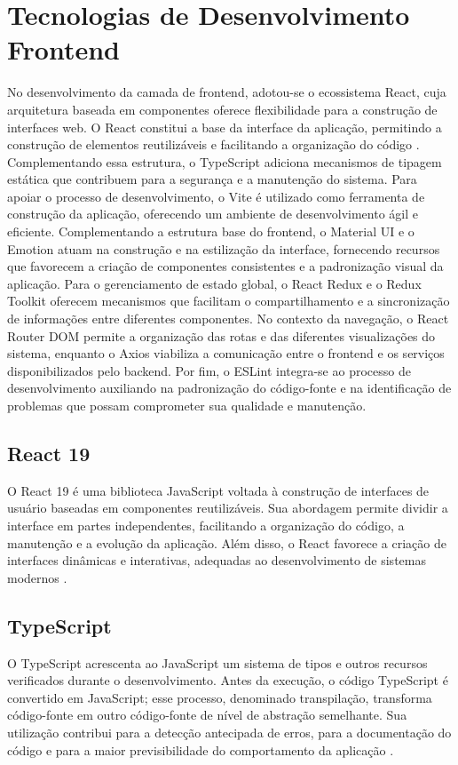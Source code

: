 \section{Tecnologias de Desenvolvimento Frontend}
No desenvolvimento da camada de frontend, adotou-se o ecossistema React, cuja arquitetura baseada em componentes oferece flexibilidade para a construção de interfaces web. O React constitui a base da interface da aplicação, permitindo a construção de elementos reutilizáveis e facilitando a organização do código \cite{react2026}. Complementando essa estrutura, o TypeScript adiciona mecanismos de tipagem estática que contribuem para a segurança e a manutenção do sistema. Para apoiar o processo de desenvolvimento, o Vite é utilizado como ferramenta de construção da aplicação, oferecendo um ambiente de desenvolvimento ágil e eficiente.
Complementando a estrutura base do frontend, o Material UI e o Emotion atuam na construção e na estilização da interface, fornecendo recursos que favorecem a criação de componentes consistentes e a padronização visual da aplicação. Para o gerenciamento de estado global, o React Redux e o Redux Toolkit oferecem mecanismos que facilitam o compartilhamento e a sincronização de informações entre diferentes componentes. No contexto da navegação, o React Router DOM permite a organização das rotas e das diferentes visualizações do sistema, enquanto o Axios viabiliza a comunicação entre o frontend e os serviços disponibilizados pelo backend. Por fim, o ESLint integra-se ao processo de desenvolvimento auxiliando na padronização do código-fonte e na identificação de problemas que possam comprometer sua qualidade e manutenção.

\subsection{React 19}
O React 19 é uma biblioteca JavaScript voltada à construção de interfaces de usuário baseadas em componentes reutilizáveis. Sua abordagem permite dividir a interface em partes independentes, facilitando a organização do código, a manutenção e a evolução da aplicação. Além disso, o React favorece a criação de interfaces dinâmicas e interativas, adequadas ao desenvolvimento de sistemas modernos \cite{react2026}.

\subsection{TypeScript}
O TypeScript acrescenta ao JavaScript um sistema de tipos e outros recursos verificados durante o desenvolvimento. Antes da execução, o código TypeScript é convertido em JavaScript; esse processo, denominado transpilação, transforma código-fonte em outro código-fonte de nível de abstração semelhante. Sua utilização contribui para a detecção antecipada de erros, para a documentação do código e para a maior previsibilidade do comportamento da aplicação \cite{typescript2026}.

